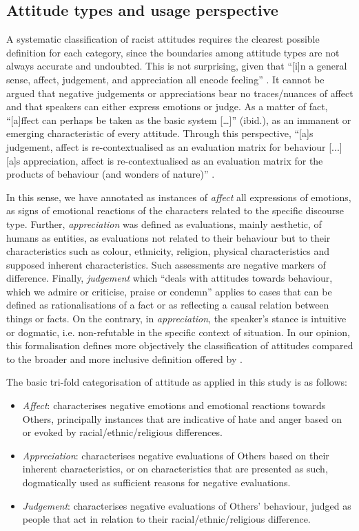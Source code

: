 \documentclass[output=paper]{LSP/langsci}
\begin{document}
\subsection{Attitude types and usage perspective} \label{sec:2:4:2}

A systematic classification of racist attitudes requires the clearest possible definition for each category, since the boundaries among attitude types are not always accurate and undoubted. This is not surprising, given that “[i]n a general sense, affect, judgement, and appreciation all encode feeling” \citep[147]{Martin2000}. It cannot be argued that negative judgements or appreciations bear no traces/nuances of affect and that speakers can either express emotions or judge. As a matter of fact, “[a]ffect can perhaps be taken as the basic system […]” (ibid.), as an immanent or emerging characteristic of every attitude. Through this perspective, “[a]s judgement, affect is re-contextualised as an evaluation matrix for behaviour [...] [a]s appreciation, affect is re-contextualised as an evaluation matrix for the products of behaviour (and wonders of nature)” \citep[147]{Martin2000}.

In this sense, we have annotated as instances of \textit{affect} all expressions of emotions, as signs of emotional reactions of the characters related to the specific discourse type. Further, \textit{appreciation} was defined as evaluations, mainly aesthetic, of humans as entities, as evaluations not related to their behaviour but to their characteristics such as colour, ethnicity, religion, physical characteristics and supposed inherent characteristics. Such assessments are negative markers of difference. Finally, \textit{judgement} which “deals with attitudes towards behaviour, which we admire or criticise, praise or condemn” \citep[42]{MartinWhite2005} applies to cases that can be defined as rationalisations of a fact or as reflecting a causal relation between things or facts. On the contrary, in \textit{appreciation}, the speaker's stance is intuitive or dogmatic, i.e. non-refutable in the specific context of situation. In our opinion, this formalisation defines more objectively the classification of attitudes compared to the broader and more inclusive definition offered by \citet[42--45]{MartinWhite2005}.

The basic tri-fold categorisation of attitude as applied in this study is as follows:

\begin{itemize}
\item \textit{Affect}: characterises negative emotions and emotional reactions towards Others, principally instances that are indicative of hate and anger based on or evoked by racial/ethnic/religious differences.
\item \textit{Appreciation}: characterises negative evaluations of Others based on their inherent characteristics, or on characteristics that are presented as such, dogmatically used as sufficient reasons for negative evaluations.
\item \textit{Judgement}: characterises negative evaluations of Others' behaviour, judged as people that act in relation to their racial/ethnic/religious difference.
\end{itemize}
\end{document}

